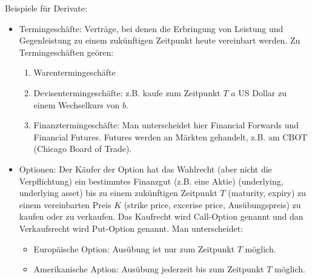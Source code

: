 \documentclass[a4paper,twoside,DIV15,BCOR12mm]{scrbook}
\begin{document}
Beispiele für Derivate:
\begin{itemize}
\item Termingeschäfte: Verträge, bei denen die Erbringung von Leistung und Gegenleistung zu einem zukünftigen Zeitpunkt heute vereinbart werden. Zu Termingeschäften geören:
\begin{enumerate}
\item Warentermingeschäfte
\item Devisentermingeschäfte: z.B. kaufe zum Zeitpunkt $T$ $a$ US Dollar zu einem Wechselkurs von $b$.
\item Finanztermingeschäfte: Man unterscheidet hier Financial Forwards und Financial Futures. Futures werden an Märkten gehandelt, z.B. am CBOT (Chicago Board of Trade). 
\end{enumerate}
\item Optionen: Der Käufer der Option hat das Wahlrecht (aber nicht die Verpflichtung) ein bestimmtes Finanzgut (z.B. eine Aktie) (underlying, underlying asset) bis zu einem zukünftigen Zeitpunkt $T$ (maturity, expiry) zu einem vereinbarten Preis $K$ (strike price, excerise price, Ausübungspreis) zu kaufen oder zu verkaufen. Das Kaufrecht wird Call-Option genannt und dan Verkaufsrecht wird Put-Option genannt. Man unterscheidet:
\begin{itemize}
\item Europäische Option: Ausübung ist nur zum Zeitpunkt $T$ möglich.
\item Amerikanische Aption: Ausübung jederzeit bis zum Zeitpunkt $T$ möglich.
\end{itemize}
\end{itemize}
\end{document}
